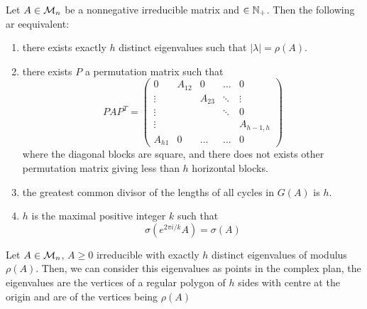 \documentclass[aspectratio=169]{beamer}
\begin{document}
\begin{frame}
\begin{theorem}
Let $A\in \mathcal{M}_n$ be a nonnegative irreducible matrix and $\in \mathbb{N}_{+}$. Then the following ar eequivalent:
\begin{enumerate}
    \item there exists exactly $h$ distinct eigenvalues such that $|\lambda| = \rho(A)$.
    \item there exists $P$ a permutation matrix such that 
    \[PAP^{T}= \begin{pmatrix}
    0& A_{12}&0 & \dots & 0\\
    \vdots& & A_{23}& \ddots&\vdots \\
    \vdots&& &\ddots&0 \\
    \vdots&& && A_{h-1,h}\\
    A_{h1} &0&\ldots& \ldots & 0
    \end{pmatrix}\]
    where the diagonal blocks are square, and there does not exists other permutation matrix giving less than $h$ horizontal blocks.
    \item the greatest common divisor of the lengths of all cycles in $G(A)$ is $h$.
    \item $h$ is the maximal positive integer $k$ such that 
    \[\sigma(e^{2\pi i /k}A)= \sigma(A)\]
\end{enumerate}
\end{theorem}
\end{frame}


\begin{frame}
\begin{corollary}
Let $A\in \mathcal{M}_n$, $A\geq 0$ irreducible with exactly $h$ distinct eigenvalues of modulus $\rho(A)$. Then, we can consider this eigenvalues as points in the complex plan, the eigenvalues are the vertices of a regular polygon of $h$ sides with centre at the origin and are of the vertices being $\rho(A)$

\end{corollary}
\end{frame}
\end{document}
